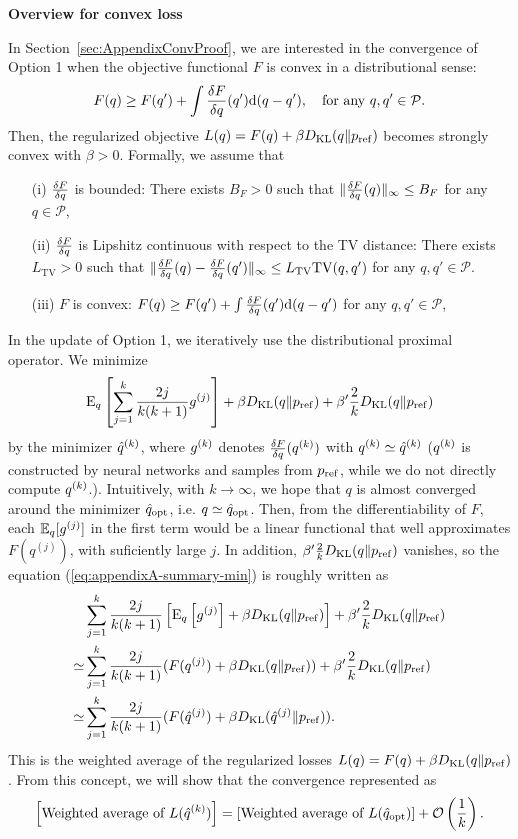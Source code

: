 \textbf{Overview for convex loss}

In Section~\ref{sec:AppendixConvProof}, we are interested in the convergence of Option 1 when the objective functional $F$ is convex in a distributional sense:
\begin{equation}
    F(q) \geq F(q') + \int \frac{\delta F}{\delta q}(q')\mathrm{d}(q-q'), \quad \text{for any $q,q'\in\mathcal{P}$}.
\end{equation}
Then, the regularized objective $L(q) = F(q) + \beta D_{\mathrm{KL}}(q\|p_{\rm{ref}})$ becomes strongly convex with $\beta>0$.
Formally, we assume that
\begin{enumerate}[topsep=0mm,itemsep=-1mm,leftmargin = 6mm]
    \item[(i)] $\frac{\delta F}{\delta q}$ is bounded: There exists $B_F > 0$ such that $\|\frac{\delta F}{\delta q}(q)\|_\infty \leq B_F$ for any $q \in \mathcal{P}$,
    \item[(ii)] $\frac{\delta F}{\delta q}$ is Lipshitz continuous with respect to the TV distance: There exists $L_{\mathrm{TV}}  > 0$ such that $\|\frac{\delta F}{\delta q}(q) - \frac{\delta F}{\delta q}(q')\|_\infty \leq L_\mathrm{TV} \mathrm{TV}(q,q')$ for any $q,q' \in \mathcal{P}$.
    \item[(iii)] $F$ is convex: $F(q) \geq F(q') + \int \frac{\delta F}{\delta q}(q')\mathrm{d}(q-q')$ for any $q,q' \in \mathcal{P}$,
\end{enumerate}
In the update of Option 1, we iteratively use the distributional proximal operator. We minimize
\begin{equation}
\mathrm{E}_{q}\left[\sum_{j=1}^{k}\frac{2j}{k (k+1)} g^{(j)}\right] + \beta D_{\mathrm{KL}}(q\|p_{\rm{ref}})  
+ \beta' \frac{2}{k}D_{\mathrm{KL}}(q\|p_{\rm{ref}}) \label{eq:appendixA-summary-min}
\end{equation}
by the minimizer $\hat{q}^{(k)}$, where  ${g}^{(k)}$ denotes $\frac{\delta F}{\delta q}(q^{(k)})$ with $q^{(k)} \simeq \hat{q}^{(k)}$ ($q^{(k)}$ is constructed by neural networks and samples from $p_{\rm{ref}}$, while we do not directly compute $q^{(k)}$.). Intuitively, with $k \to \infty$, we hope that $q$ is almost converged around the minimizer $\hat{q}_{\mathrm{opt}}$, i.e. $q \simeq \hat{q}_{\mathrm{opt}}$. Then, from the differentiability of $F$, each $\mathbb{E}_q[g^{(j)}]$ in the first term 
would be a linear functional that well approximates $F(q^{(j)})$, with suficiently large $j$. In addition, $\beta' \frac{2}{k}D_{\mathrm{KL}}(q\|p_{\rm{ref}})$ vanishes, so the equation (\ref{eq:appendixA-summary-min}) is roughly written as
\begin{align}
    &\sum_{j=1}^{k}\frac{2j}{k (k+1)} \left[ \mathrm{E}_{q}\left[g^{(j)}\right] + \beta D_{\mathrm{KL}}(q\|p_{\rm{ref}}) \right] 
+ \beta' \frac{2}{k}D_{\mathrm{KL}}(q\|p_{\rm{ref}}) \\
\simeq &\sum_{j=1}^{k}\frac{2j}{k (k+1)} (F(q^{(j)}) +\beta D_{\mathrm{KL}}(q\|p_{\rm{ref}}))
+ \beta' \frac{2}{k}D_{\mathrm{KL}}(q\|p_{\rm{ref}})\\
\simeq &\sum_{j=1}^{k}\frac{2j}{k (k+1)} (F(\hat{q}^{(j)}) +\beta D_{\mathrm{KL}}(\hat{q}^{(j)}\|p_{\rm{ref}})).
\end{align}
This is the weighted average of the regularized losses $L(q) = F(q) + \beta D_{\mathrm{KL}}(q\|p_{\rm{ref}})$.
From this concept, we will show that the convergence represented as
\begin{equation}
    \left[ \text{Weighted average of } L(\hat{q}^{(k)}) \right] = \left[ \text{Weighted average of } L(\hat{q}_{\mathrm{opt}}) \right]+ \mathcal{O}\left(\frac{1}{k}\right).
\end{equation}

